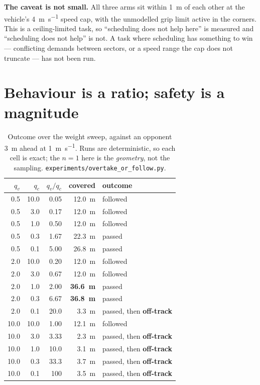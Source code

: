 \documentclass[letterpaper, 10 pt, conference]{ieeeconf}
\begin{document}
\textbf{The caveat is not small.} All three arms sit within \SI{1}{\meter} of
each other at the vehicle's \SI{4}{\meter\per\second} speed cap, with the
unmodelled grip limit active in the corners. This is a ceiling-limited task, so
``scheduling does not help here'' is measured and ``scheduling does not help''
is not. A task where scheduling has something to win --- conflicting demands
between sectors, or a speed range the cap does not truncate --- has not been
run.

\section{Behaviour is a ratio; safety is a magnitude}\label{sec:axes}
\begin{table}[t]
  \centering
  \caption{Outcome over the weight sweep, against an opponent \SI{3}{\meter}
  ahead at \SI{1}{\meter\per\second}. Runs are deterministic, so each cell is
  exact; the $n=1$ here is the \emph{geometry}, not the sampling.
  \texttt{experiments/overtake\_or\_follow.py}.}
  \label{tab:grid}
  \begin{tabular}{rrrrl}
    \toprule
    $q_v$ & $q_c$ & $q_v/q_c$ & covered & outcome \\
    \midrule
    0.5 & 10.0 & 0.05 & \SI{12.0}{\meter} & followed \\
    0.5 & 3.0  & 0.17 & \SI{12.0}{\meter} & followed \\
    0.5 & 1.0  & 0.50 & \SI{12.0}{\meter} & followed \\
    0.5 & 0.3  & 1.67 & \SI{22.3}{\meter} & passed \\
    0.5 & 0.1  & 5.00 & \SI{26.8}{\meter} & passed \\
    \midrule
    2.0 & 10.0 & 0.20 & \SI{12.0}{\meter} & followed \\
    2.0 & 3.0  & 0.67 & \SI{12.0}{\meter} & followed \\
    2.0 & 1.0  & 2.00 & \textbf{\SI{36.6}{\meter}} & passed \\
    2.0 & 0.3  & 6.67 & \textbf{\SI{36.8}{\meter}} & passed \\
    2.0 & 0.1  & 20.0 & \SI{3.3}{\meter}  & passed, then \textbf{off-track} \\
    \midrule
    10.0 & 10.0 & 1.00 & \SI{12.1}{\meter} & followed \\
    10.0 & 3.0  & 3.33 & \SI{2.3}{\meter} & passed, then \textbf{off-track} \\
    10.0 & 1.0  & 10.0 & \SI{3.1}{\meter} & passed, then \textbf{off-track} \\
    10.0 & 0.3  & 33.3 & \SI{3.7}{\meter} & passed, then \textbf{off-track} \\
    10.0 & 0.1  & 100  & \SI{3.5}{\meter} & passed, then \textbf{off-track} \\
    \bottomrule
  \end{tabular}
\end{table}
\end{document}

